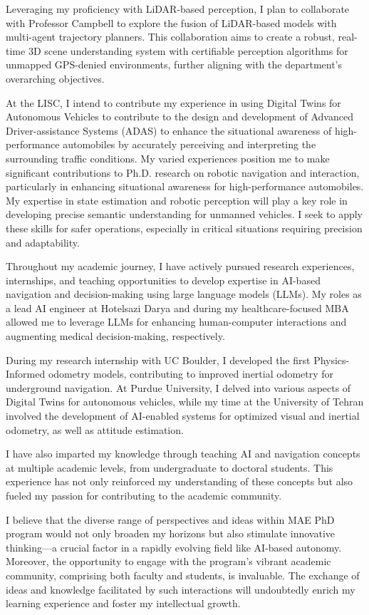 \documentclass[a4,20pt]{article}
\begin{document}
\begin{large}
Leveraging my proficiency with LiDAR-based perception, I plan to collaborate with Professor Campbell to explore the fusion of LiDAR-based models with multi-agent trajectory planners. This collaboration aims to create a robust, real-time 3D scene understanding system with certifiable perception algorithms for unmapped GPS-denied environments, further aligning with the department's overarching objectives.

At the LISC, I intend to contribute my experience in using Digital Twins for Autonomous Vehicles to contribute to the design and development of Advanced Driver-assistance Systems (ADAS) to enhance the situational awareness of high-performance automobiles by accurately perceiving and interpreting the surrounding traffic conditions. My varied experiences position me to make significant contributions to Ph.D. research on robotic navigation and interaction, particularly in enhancing situational awareness for high-performance automobiles. My expertise in state estimation and robotic perception will play a key role in developing precise semantic understanding for unmanned vehicles. I seek to apply these skills for safer operations, especially in critical situations requiring precision and adaptability.


Throughout my academic journey, I have actively pursued research experiences, internships, and teaching opportunities to develop expertise in AI-based navigation and decision-making using large language models (LLMs). My roles as a lead AI engineer at Hotelsazi Darya and during my healthcare-focused MBA allowed me to leverage LLMs for enhancing human-computer interactions and augmenting medical decision-making, respectively.

During my research internship with UC Boulder, I developed the first Physics-Informed odometry models, contributing to improved inertial odometry for underground navigation. At Purdue University, I delved into various aspects of Digital Twins for autonomous vehicles, while my time at the University of Tehran involved the development of AI-enabled systems for optimized visual and inertial odometry, as well as attitude estimation.

I have also imparted my knowledge through teaching AI and navigation concepts at multiple academic levels, from undergraduate to doctoral students. This experience has not only reinforced my understanding of these concepts but also fueled my passion for contributing to the academic community.


I believe that the diverse range of perspectives and ideas within MAE PhD program would not only broaden my horizons but also stimulate innovative thinking—a crucial factor in a rapidly evolving field like AI-based autonomy. Moreover, the opportunity to engage with the program's vibrant academic community, comprising both faculty and students, is invaluable. The exchange of ideas and knowledge facilitated by such interactions will undoubtedly enrich my learning experience and foster my intellectual growth.


\end{large}
\end{document}
